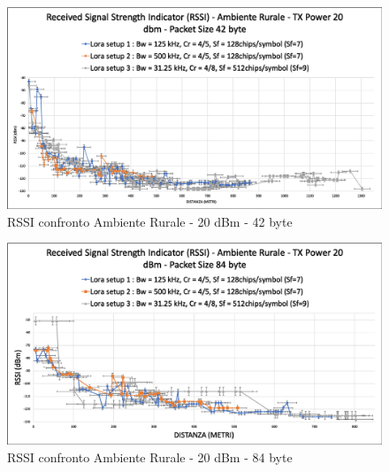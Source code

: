 \documentclass[12pt,a4paper,openright,twoside]{report}
\begin{document}
\begin{figure}[h]                      
\begin{center} 
\includegraphics[width=\textwidth]{RSSI_confronto_AR_20dBm-42byte.png}
\caption[RSSI confronto Ambiente Rurale - 20 dBm - 42 byte]{RSSI confronto Ambiente Rurale - 20 dBm - 42 byte}\label{fig:prima}
\end{center}
\end{figure}

\begin{figure}[h!]                      
\begin{center} 
\includegraphics[width=\textwidth]{RSSI_confronto_AR-20dBm-84byte.png}
\caption[RSSI confronto Ambiente Rurale - 20 dBm - 84 byte]{RSSI confronto Ambiente Rurale - 20 dBm - 84 byte}\label{fig:prima}
\end{center}
\end{figure}
\end{document}

